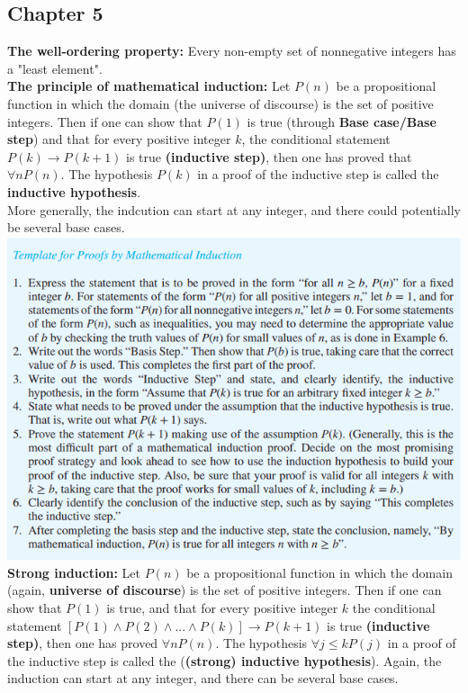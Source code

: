 \documentclass[12pt]{article}
\begin{document}
\subsection{Chapter 5}
\textbf{The well-ordering property:} Every non-empty set of nonnegative integers has a "least element". \\
\textbf{The principle of mathematical induction:} Let $P(n)$ be a propositional function in which the domain (the universe of discourse) is the set of positive integers. Then if one can show that $P(1)$ is true (through \textbf{Base case/Base step}) and that for every positive integer $k$, the conditional statement $P(k) \rightarrow P(k+1)$ is true \textbf{(inductive step)}, then one has proved that $\forall n P(n)$. The hypothesis $P(k)$ in a proof of the inductive step is called the \textbf{inductive hypothesis}. \\
More generally, the indcution can start at any integer, and there could potentially be several base cases. \\
\includegraphics{induction_template} \\
\textbf{Strong induction:} Let $P(n)$ be a propositional function in which the domain (again, \textbf{universe of discourse}) is the set of positive integers. Then if one can show that $P(1)$ is true, and that for every positive integer $k$ the conditional statement $[P(1) \wedge P(2) \wedge ... \wedge P(k)] \rightarrow P(k + 1)$ is true \textbf{(inductive step)}, then one has proved $\forall n P(n)$. The hypothesis $\forall j \leq k P(j)$ in a proof of the inductive step is called the (\textbf{(strong) inductive hypothesis}). Again, the induction can start at any integer, and there can be several base cases. \\
\end{document}

